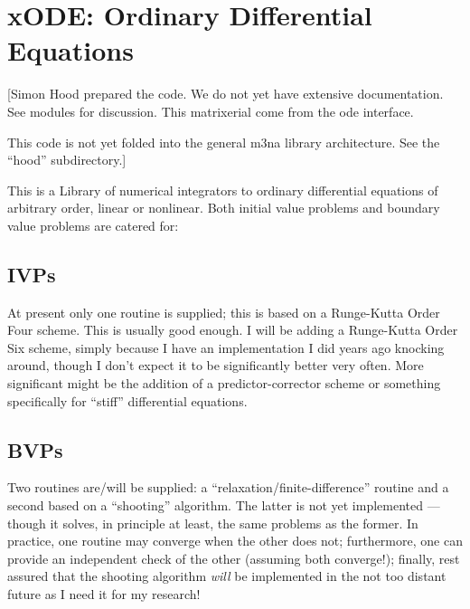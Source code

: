 \section{xODE: Ordinary Differential Equations}

[Simon Hood prepared the code.  We do not yet have extensive
documentation.  See modules for discussion.  This matrixerial come from
the ode interface.

This code is not yet folded into the general m3na library architecture.
See the ``hood'' subdirectory.]

This is a Library of numerical integrators to
ordinary differential equations of arbitrary order, linear or nonlinear.
Both initial value problems and
  boundary value problems are catered for:

\subsection*{IVPs}
At present only one routine is supplied;  this is based on a 
      Runge-Kutta Order Four scheme.  This is usually good enough.  I will
      be adding a Runge-Kutta Order Six scheme, simply because I have an
      implementation I did years ago knocking around, though I don't expect
      it to be significantly better very often.  More significant might be
      the addition of a predictor-corrector scheme or something specifically
      for ``stiff'' differential equations.

\subsection*{BVPs}
Two routines are/will be supplied:  
      a ``relaxation/finite-difference''
      routine and a second based on a ``shooting'' algorithm.  The latter
      is not yet implemented --- though it solves, in principle at least, 
      the same problems as the former.  In practice, one routine may converge
      when the other does not;  furthermore, one can provide an 
      independent check of the other (assuming both converge!);  finally,
      rest assured that the shooting algorithm {\it will\/} be implemented
      in the not too distant future as I need it for my research!


